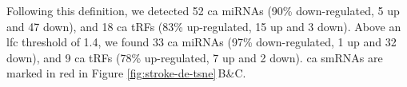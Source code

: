 Following this definition, we detected 52 \ac{ca} miRNAs (90\% down-regulated, 5 up and 47 down), and 18 \ac{ca} tRFs (83\% up-regulated, 15 up and 3 down). Above an \ac{lfc} threshold of 1.4, we found 33 \ac{ca} miRNAs (97\% down-regulated, 1 up and 32 down), and 9 \ac{ca} tRFs (78\% up-regulated, 7 up and 2 down). \ac{ca} smRNAs are marked in red in Figure \ref{fig:stroke-de-tsne}\,B\&C.

\newpage
